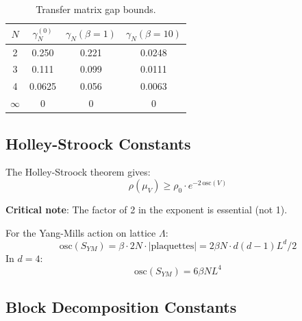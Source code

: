 \begin{table}[ht]
\centering
\begin{tabular}{|c|c|c|c|}
\hline
$N$ & $\gamma_N^{(0)}$ & $\gamma_N(\beta=1)$ & $\gamma_N(\beta=10)$ \\
\hline
2 & 0.250 & 0.221 & 0.0248 \\
3 & 0.111 & 0.099 & 0.0111 \\
4 & 0.0625 & 0.056 & 0.0063 \\
$\infty$ & 0 & 0 & 0 \\
\hline
\end{tabular}
\caption{Transfer matrix gap bounds.}
\label{tab:transfer-gap}
\end{table}

\subsection{Holley-Stroock Constants}

\begin{theorem}
\label{thm:hs-constants}
The Holley-Stroock theorem gives:
\begin{equation}
\rho(\mu_V) \geq \rho_0 \cdot e^{-2\,\mathrm{osc}(V)}
\end{equation}

\textbf{Critical note}: The factor of 2 in the exponent is essential (not 1).
\end{theorem}

\begin{definition}
For the Yang-Mills action on lattice $\Lambda$:
\begin{equation}
\mathrm{osc}(S_{YM}) = \beta \cdot 2N \cdot |\text{plaquettes}| = 2\beta N \cdot d(d-1) L^d / 2
\end{equation}
In $d=4$:
\begin{equation}
\mathrm{osc}(S_{YM}) = 6\beta N L^4
\end{equation}
\end{definition}

\subsection{Block Decomposition Constants}

